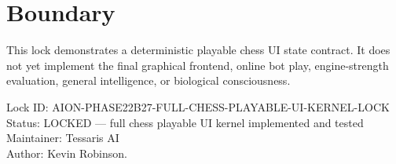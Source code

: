 \documentclass[11pt,a4paper]{article}
\begin{document}
\section{Boundary}

This lock demonstrates a deterministic playable chess UI state contract. It does not yet implement the final graphical frontend, online bot play, engine-strength evaluation, general intelligence, or biological consciousness.

\bigskip

\noindent
Lock ID: AION-PHASE22B27-FULL-CHESS-PLAYABLE-UI-KERNEL-LOCK\\
Status: LOCKED --- full chess playable UI kernel implemented and tested\\
Maintainer: Tessaris AI\\
Author: Kevin Robinson.
\end{document}
